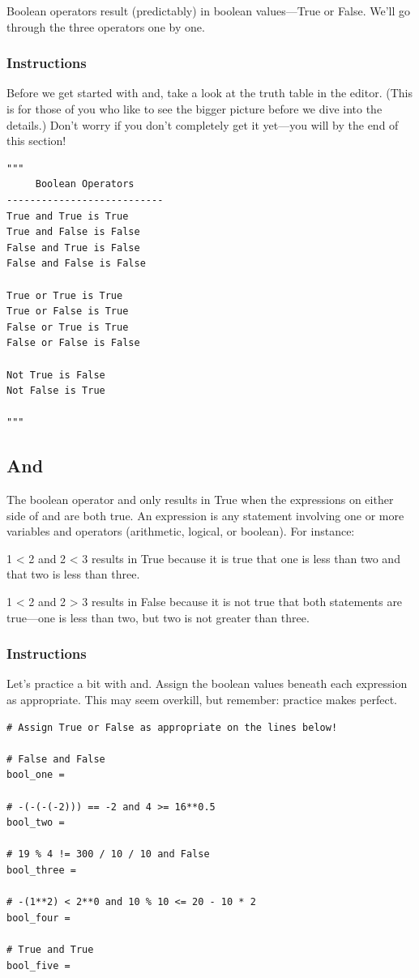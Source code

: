 \documentclass[12pt,a4paper,final,twoside,onecolumn,titlepage]{book}
\begin{document}
Boolean operators result (predictably) in boolean values—True or False. We'll go through the three operators one by one.

\subsubsection{Instructions}

Before we get started with and, take a look at the truth table in the editor. (This is for those of you who like to see the bigger picture before we dive into the details.) Don't worry if you don't completely get it yet—you will by the end of this section!

\begin{lstlisting}
"""
     Boolean Operators
---------------------------
True and True is True
True and False is False
False and True is False
False and False is False

True or True is True
True or False is True
False or True is True
False or False is False

Not True is False
Not False is True

"""
\end{lstlisting}

\subsection{And}

The boolean operator and only results in True when the expressions on either side of and are both true. An expression is any statement involving one or more variables and operators (arithmetic, logical, or boolean). For instance:

1 < 2 and 2 < 3 results in True because it is true that one is less than two and that two is less than three.

1 < 2 and 2 > 3 results in False because it is not true that both statements are true—one is less than two, but two is not greater than three.

\subsubsection{Instructions}

Let's practice a bit with and. Assign the boolean values beneath each expression as appropriate. This may seem overkill, but remember: practice makes perfect.

\begin{lstlisting}
# Assign True or False as appropriate on the lines below!

# False and False
bool_one = 

# -(-(-(-2))) == -2 and 4 >= 16**0.5
bool_two = 

# 19 % 4 != 300 / 10 / 10 and False
bool_three = 

# -(1**2) < 2**0 and 10 % 10 <= 20 - 10 * 2
bool_four = 

# True and True
bool_five = 
\end{lstlisting}
\end{document}
